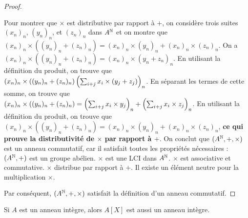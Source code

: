 \documentclass[12pt,a4paper]{report}
\begin{document}
\begin{proof}
\begin{outline}
        \1 Pour montrer que $\times$ est distributive par rapport à $+$, on considère trois suites $(x_n)_n$, $(y_n)_n$, et $(z_n)_n$ dans $A^{\mathbb{N}}$ et on montre que $(x_n)_n \times ((y_n)_n + (z_n)_n) = (x_n)_n \times (y_n)_n + (x_n)_n \times (z_n)_n$.
            \2 On a $(x_n)_n \times ((y_n)_n + (z_n)_n) = (x_n)_n \times (y_n+z_n)_n$.
            \2 En utilisant la définition du produit, on trouve que $(x_n)_n \times ((y_n)_n + (z_n)_n)\left(\sum_{i+j} x_i \times (y_j + z_j)\right)_n$.
            \2 En séparant les termes de cette somme, on trouve que $(x_n)_n \times ((y_n)_n + (z_n)_n) = \left(\sum_{i+j} x_i \times y_j\right)_n + \left(\sum_{i+j} x_i \times z_j\right)_n$.
            \2 En utilisant la définition du produit, on trouve que $(x_n)_n \times ((y_n)_n + (z_n)_n) = (x_n)_n \times (y_n)_n + (x_n)_n \times (z_n)_n$, \textbf{ce qui prouve la distributivité de $\times$ par rapport à $+$}.
        \1 On conclut que $(A^{\mathbb{N}}, +, \times)$ est un anneau commutatif, car il satisfait toutes les propriétés nécessaires : 
            \2 $(A^{\mathbb{N}}, +)$ est un groupe abélien.
            \2 $\times$ est une LCI dans $A^{\mathbb{N}}$.
            \2 $\times$ est associative et commutative.
            \2 $\times$ distribue par rapport à $+$.
            \2 Il existe un élément neutre pour la multiplication $\times$.
    \end{outline}
    
    Par conséquent, $(A^{\mathbb{N}}, +, \times)$ satisfait la définition d'un anneau commutatif.
\end{proof}

\begin{property}
    Si $A$ est un anneau intègre, alors $A[X]$ est aussi un anneau intègre.
\end{property}
\end{document}

